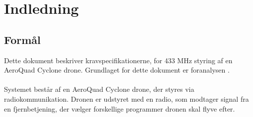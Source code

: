 \documentclass[Main]{subfiles}
\begin{document}
\chapter{Indledning}

\section{Formål}

Dette dokument beskriver kravspecifikationerne, for 433 MHz styring af en AeroQuad Cyclone drone\cite{AQ-store}. Grundlaget for dette dokument er foranalysen \cite{Foranalyse}.
\\
\\
Systemet består af en AeroQuad Cyclone drone, der styres via radiokommunikation.
Dronen er udstyret med en radio, som modtager signal fra en fjernbetjening, der vælger forskellige programmer dronen skal flyve efter.
\end{document}
